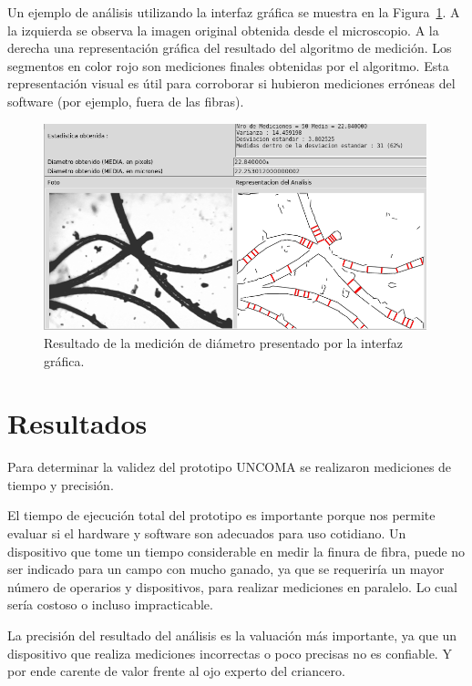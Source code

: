 \documentclass[runningheads,a4paper]{llncs}
\begin{document}
Un ejemplo de análisis utilizando la interfaz gráfica se muestra en la Figura~\ref{fig:captura3}.
A la izquierda se observa la imagen original obtenida desde el microscopio. A la derecha una representación gráfica del resultado del algoritmo de medición. Los segmentos en color rojo son mediciones finales obtenidas por el algoritmo. Esta representación visual es útil para corroborar si hubieron mediciones erróneas del software (por ejemplo, fuera de las fibras).
\begin{figure}
\centering
\includegraphics[height=6cm]{captura3}
\caption{Resultado de la medición de diámetro presentado por la interfaz gráfica.}
\label{fig:captura3}
\end{figure}

\section{Resultados}\label{sec:res}

Para determinar la validez del prototipo UNCOMA se realizaron mediciones de tiempo y precisión.

El tiempo de ejecución total del prototipo es importante porque nos permite evaluar si el hardware y software son adecuados para uso cotidiano. Un dispositivo que tome un tiempo considerable en medir la finura de fibra, puede no ser indicado para un campo con mucho ganado, ya que se requeriría un mayor número de operarios y dispositivos, para realizar mediciones en paralelo. Lo cual sería costoso o incluso impracticable.

La precisión del resultado del análisis es la valuación más importante, ya que un dispositivo que realiza mediciones incorrectas o poco precisas no es confiable. Y por ende carente de valor frente al ojo experto del criancero. 
\end{document}
